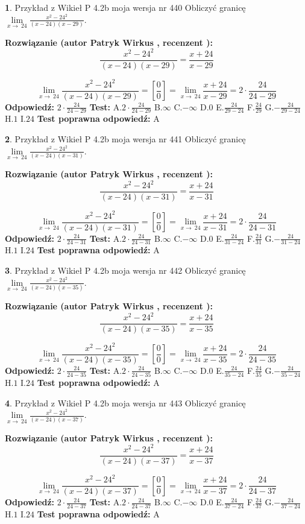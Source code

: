 \documentclass[12pt, a4paper]{article}
\theoremstyle{definition} %
\newtheorem{zad}{}
\newcommand{\zadStart}[1]{\begin{zad}#1\newline}
\newcommand{\zadStop}{\end{zad}}
\newcommand{\rozwStart}[2]{\noindent \textbf{Rozwiązanie (autor #1 , recenzent #2): }\newline}
\newcommand{\rozwStop}{\newline}
\newcommand{\odpStart}{\noindent \textbf{Odpowiedź:}\newline}
\newcommand{\odpStop}{\newline}
\newcommand{\testStart}{\noindent \textbf{Test:}\newline}
\newcommand{\testStop}{\newline}
\newcommand{\kluczStart}{\noindent \textbf{Test poprawna odpowiedź:}\newline}
\newcommand{\kluczStop}{\newline}
\begin{document}
\zadStart{Przykład z Wikieł P 4.2b moja wersja nr 440}
Obliczyć granicę $\lim\limits_{x\to\ 24}\frac{x^{2}-24^{2}}{(x-24)(x-29)}$.
\zadStop
\rozwStart{Patryk Wirkus}{}
$$\frac{x^{2}-24^{2}}{(x-24)(x-29)}=\frac{x+24}{x-29}$$

$$\lim\limits_{x\to\ 24}\frac{x^{2}-24^{2}}{(x-24)(x-29)}=[\frac{0}{0}]=\lim\limits_{x\to\ 24}\frac{x+24}{x-29}=2 \cdot \frac{24}{24-29}$$
\rozwStop
\odpStart
$2 \cdot \frac{24}{24-29}$
\odpStop
\testStart
A.$2 \cdot \frac{24}{24-29}$
B.$\infty$
C.$-\infty$
D.$0$
E.$\frac{24}{29-24}$
F.$\frac{24}{29}$
G.$-\frac{24}{29-24}$
H.$1$
I.$24$
\testStop
\kluczStart
A
\kluczStop



\zadStart{Przykład z Wikieł P 4.2b moja wersja nr 441}
Obliczyć granicę $\lim\limits_{x\to\ 24}\frac{x^{2}-24^{2}}{(x-24)(x-31)}$.
\zadStop
\rozwStart{Patryk Wirkus}{}
$$\frac{x^{2}-24^{2}}{(x-24)(x-31)}=\frac{x+24}{x-31}$$

$$\lim\limits_{x\to\ 24}\frac{x^{2}-24^{2}}{(x-24)(x-31)}=[\frac{0}{0}]=\lim\limits_{x\to\ 24}\frac{x+24}{x-31}=2 \cdot \frac{24}{24-31}$$
\rozwStop
\odpStart
$2 \cdot \frac{24}{24-31}$
\odpStop
\testStart
A.$2 \cdot \frac{24}{24-31}$
B.$\infty$
C.$-\infty$
D.$0$
E.$\frac{24}{31-24}$
F.$\frac{24}{31}$
G.$-\frac{24}{31-24}$
H.$1$
I.$24$
\testStop
\kluczStart
A
\kluczStop



\zadStart{Przykład z Wikieł P 4.2b moja wersja nr 442}
Obliczyć granicę $\lim\limits_{x\to\ 24}\frac{x^{2}-24^{2}}{(x-24)(x-35)}$.
\zadStop
\rozwStart{Patryk Wirkus}{}
$$\frac{x^{2}-24^{2}}{(x-24)(x-35)}=\frac{x+24}{x-35}$$

$$\lim\limits_{x\to\ 24}\frac{x^{2}-24^{2}}{(x-24)(x-35)}=[\frac{0}{0}]=\lim\limits_{x\to\ 24}\frac{x+24}{x-35}=2 \cdot \frac{24}{24-35}$$
\rozwStop
\odpStart
$2 \cdot \frac{24}{24-35}$
\odpStop
\testStart
A.$2 \cdot \frac{24}{24-35}$
B.$\infty$
C.$-\infty$
D.$0$
E.$\frac{24}{35-24}$
F.$\frac{24}{35}$
G.$-\frac{24}{35-24}$
H.$1$
I.$24$
\testStop
\kluczStart
A
\kluczStop



\zadStart{Przykład z Wikieł P 4.2b moja wersja nr 443}
Obliczyć granicę $\lim\limits_{x\to\ 24}\frac{x^{2}-24^{2}}{(x-24)(x-37)}$.
\zadStop
\rozwStart{Patryk Wirkus}{}
$$\frac{x^{2}-24^{2}}{(x-24)(x-37)}=\frac{x+24}{x-37}$$

$$\lim\limits_{x\to\ 24}\frac{x^{2}-24^{2}}{(x-24)(x-37)}=[\frac{0}{0}]=\lim\limits_{x\to\ 24}\frac{x+24}{x-37}=2 \cdot \frac{24}{24-37}$$
\rozwStop
\odpStart
$2 \cdot \frac{24}{24-37}$
\odpStop
\testStart
A.$2 \cdot \frac{24}{24-37}$
B.$\infty$
C.$-\infty$
D.$0$
E.$\frac{24}{37-24}$
F.$\frac{24}{37}$
G.$-\frac{24}{37-24}$
H.$1$
I.$24$
\testStop
\kluczStart
A
\kluczStop
\end{document}
